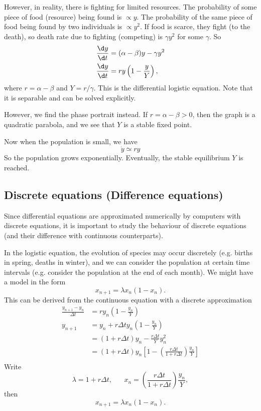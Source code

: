 \documentclass[a4paper]{article}
\begin{document}
However, in reality, there is fighting for limited resources. The probability of some piece of food (resource) being found is $\propto y$. The probability of the same piece of food being found by two individuals is $\propto y^2$. If food is scarce, they fight (to the death), so death rate due to fighting (competing) is $\gamma y^2$ for some $\gamma$. So
\begin{align*}
  \frac{\d y}{\d t} &= (\alpha - \beta)y - \gamma y^2\\
  \frac{\d y}{\d t}&= ry \left(1 - \frac{y}{Y}\right),
\end{align*}
where $r = \alpha - \beta$ and $Y = r/\gamma$. This is the differential logistic equation. Note that it is separable and can be solved explicitly.

However, we find the phase portrait instead. If $r = \alpha - \beta > 0$, then the graph is a quadratic parabola, and we see that $Y$ is a stable fixed point.


Now when the population is small, we have
\[
\dot y \simeq ry
\]
So the population grows exponentially. Eventually, the stable equilibrium $Y$ is reached.

\subsection{Discrete equations (Difference equations)}
Since differential equations are approximated numerically by computers with discrete equations, it is important to study the behaviour of discrete equations (and their difference with continuous counterparts).

In the logistic equation, the evolution of species may occur discretely (e.g. births in spring, deaths in winter), and we can consider the population at certain time intervals (e.g. consider the population at the end of each month). We might have a model in the form
\[
x_{n + 1} = \lambda x_n(1 - x_n).
\]
This can be derived from the continuous equation with a discrete approximation
\begin{align*}
  \frac{y_{n+1} - y_n}{\Delta t} &= ry_n\left(1 - \frac{y_n}{Y}\right)\\
  y_{n + 1} &= y_n + r\Delta ty_n\left(1 - \frac{y_n}{Y}\right)\\
  &= (1 + r\Delta t)y_n - \frac{r\Delta t}{Y}y_n^2\\
  &= (1 + r\Delta t)y_n\left[1 - \left(\frac{r\Delta t}{1 + r\Delta t}\right)\frac{y_n}{Y}\right]\\
\end{align*}
Write
\[
\lambda = 1 + r\Delta t,\;\;\;\;\;\; x_n = \left(\frac{r\Delta t}{1 + r\Delta t}\right)\frac{y_n}{Y},
\]
then
\[
x_{n+1}=\lambda x_n(1 - x_n).
\]
\end{document}
